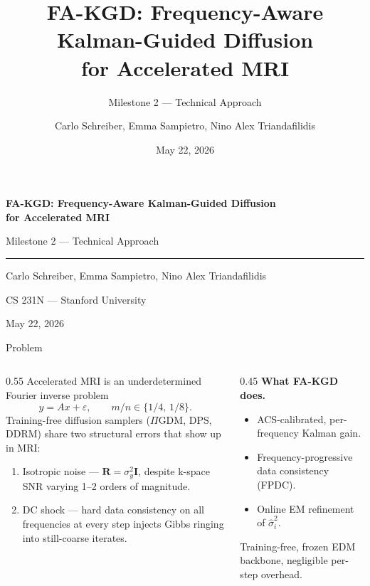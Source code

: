 \documentclass[aspectratio=169]{beamer}
\title{FA-KGD: Frequency-Aware Kalman-Guided Diffusion\\for Accelerated MRI}
\subtitle{Milestone 2 --- Technical Approach}
\author{Carlo Schreiber, Emma Sampietro, Nino Alex Triandafilidis}
\institute{CS 231N --- Stanford University}
\date{May 22, 2026}
\newcommand{\PIGDM}{$\Pi$GDM}
\newcommand{\FAKGD}{FA-KGD}
\newcommand{\hatsig}{\hat{\sigma}}
\begin{document}
\begin{frame}[plain]
  \vfill
  {\Large\bfseries FA-KGD: Frequency-Aware Kalman-Guided Diffusion\\for Accelerated MRI\par}
  \vspace{0.5em}
  {\normalsize Milestone 2 --- Technical Approach\par}
  \vspace{0.6em}
  {\color{stanfordred}\rule{0.82\textwidth}{1.2pt}}
  \vspace{0.8em}

  {\small Carlo Schreiber, Emma Sampietro, Nino Alex Triandafilidis\par}
  \vspace{0.35em}
  {\small CS 231N --- Stanford University\par}
  \vspace{0.35em}
  {\small May 22, 2026\par}
  \vfill
\end{frame}

\begin{frame}{Problem}
  \small
  \begin{columns}[T]
    \begin{column}{0.55\textwidth}
      Accelerated MRI is an underdetermined Fourier inverse problem
      \[
        y = Ax + \varepsilon, \qquad m/n \in \{1/4,\,1/8\}.
      \]
      Training-free diffusion samplers (\PIGDM{}, DPS, DDRM) share two structural errors that show up in MRI:
      \begin{enumerate}
        \item \alert{Isotropic noise} --- $\mathbf{R}=\sigma_y^2\mathbf{I}$, despite k-space SNR varying 1--2 orders of magnitude.
        \item \alert{DC shock} --- hard data consistency on all frequencies at every step injects Gibbs ringing into still-coarse iterates.
      \end{enumerate}
    \end{column}
    \begin{column}{0.45\textwidth}
      \textbf{What \FAKGD{} does.}
      \begin{itemize}
        \item ACS-calibrated, per-frequency Kalman gain.
        \item Frequency-progressive data consistency (FPDC).
        \item Online EM refinement of $\hatsig_i^2$.
      \end{itemize}
      Training-free, frozen EDM backbone, negligible per-step overhead.
    \end{column}
  \end{columns}
\end{frame}
\end{document}
